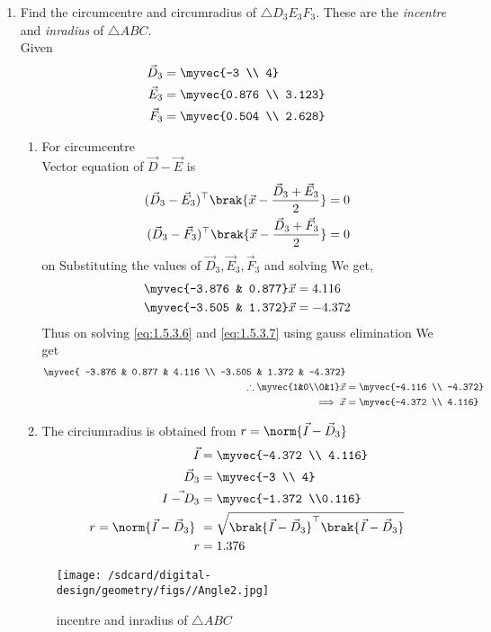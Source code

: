 \documentclass[11pt]{book}
\begin{document}
\begin{enumerate}[label=\thesection.\arabic*.,ref=\thesection.\theenumi]
\item Find the circumcentre and circumradius of $\triangle D_3E_3F_3$.  These are the {\em incentre} and {\em inradius} of $\triangle ABC$. \\
\solution Given 
\begin{align}
    \vec{D}_3 &= \myvec{-3  \\ 4} \\
    \vec{E}_3 &= \myvec{0.876  \\ 3.123} \\
    \vec{F}_3 &= \myvec{0.504 \\ 2.628} 
\end{align}
\begin{enumerate}
\item For circumcentre \\
Vector equation of $\vec{D}-\vec{E}$ is
\begin{align}
(\vec{D}_3-\vec{E}_3)^\top\brak{ \vec{x} - \frac{\vec{D}_3+\vec{E}_3}{2}} = 0 \\
(\vec{D}_3-\vec{F}_3)^\top\brak{ \vec{x} - \frac{\vec{D}_3+\vec{F}_3}{2}} = 0
\end{align}
on Substituting the values of $\vec{D}_3, \vec{E}_3, \vec{F}_3$ and solving We get,
\begin{align}
     \myvec{-3.876 & 0.877}\vec{x} &= 4.116 \label{eq:1.5.3.6} \\
     \myvec{-3.505 & 1.372}\vec{x} &= -4.372 \label{eq:1.5.3.7}
\end{align}
Thus on solving \eqref{eq:1.5.3.6} and \eqref{eq:1.5.3.7} using gauss elimination We get
\begin{align}
    \myvec{ -3.876 & 0.877 & 4.116 \\ -3.505 & 1.372 & -4.372} \\
    \therefore \myvec{1&0\\0&1}\vec{x} &= \myvec{-4.116 \\ -4.372}\\
\implies \vec{x}&=\myvec{-4.372 \\ 4.116}
\end{align}
\item The circiumradius is obtained from  $ r=\norm{\vec{I}-\vec{D}_3}$
   \begin{align}
       \vec{I} &= \myvec{-4.372 \\ 4.116} \\
       \vec{D}_3 &= \myvec{-3  \\ 4} \\
       \vec{I - D_3} &= \myvec{-1.372 \\0.116} \\
 r= \norm{\vec{I}-\vec{D}_3}\ &=  \sqrt{\brak{\vec{I}-\vec{D}_3}^{\top}\brak{\vec{I}-\vec{D}_3}} \\
 r &= 1.376
   \end{align}
\end{enumerate}
\begin{figure}[H]
    \centering
    \texttt{[image: /sdcard/digital-design/geometry/figs//Angle2.jpg]}
    \caption{incentre and inradius of $\triangle ABC$}
    \label{fig:Ang_bisect2}
\end{figure}


\end{enumerate}
\end{document}

